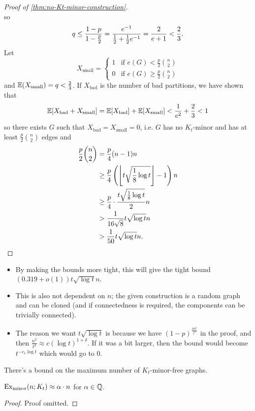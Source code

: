\documentclass[main.tex]{subfiles}
\begin{document}
\begin{proof}[Proof of \th\ref{thm:no-Kt-minor-construction}]
\[  \]
  so
  \begin{align*}
    q\leq\frac{1-p}{1 - \frac p 2} = \frac{e^{-1}}{\frac{1}{2} + \frac{1}{2} e^{-1}} = \frac{2}{e+1} < \frac 2 3.
  \end{align*}
  Let
  \[
    X_{\mathrm{small}} = \begin{cases}
      1 & \text{if }e(G) < \frac p 2\binom n 2 \\
      0 & \text{if }e(G)\geq\frac p 2\binom n 2
    \end{cases}
  \]
  and $\mathbb E(X_{\mathrm{small}}) = q < \frac 2 3$.
  If $X_{\mathrm{bad}}$ is the number of bad partitions, we have shown that
  \[
    \mathbb E[X_{\mathrm{bad}} + X_{\mathrm{small}}]
    = \mathbb E[X_{\mathrm{bad}}] + \mathbb E[X_{\mathrm{small}}] < \frac{1}{e^2} + \frac 2 3 < 1
  \]
  so there exists $G$ such that $X_{\mathrm{bad}} = X_{\mathrm{small}} = 0$,
  i.e. $G$ has no $K_t$-minor and has at least $\frac p 2\binom{n}{2}$ edges and
  \begin{align*}
    \frac p 2\binom n 2 &= \frac p 4(n-1)n \\
                        &\geq\frac p 4\left(\left\lfloor t\sqrt{\frac 1 8\log t} \right\rfloor-1\right)n \\
                        &\geq\frac p 4\cdot\frac{t\sqrt{\frac 1 8\log t}}{2}n \\
                        &> \frac{1}{16\sqrt 8}t\sqrt{\log t}n \\
                        &> \frac{1}{50}t\sqrt{\log t}n. \qedhere
  \end{align*}
\end{proof}
\begin{remark*}
  \listhack
  \begin{itemize}
    \item By making the bounds more tight, this will give the tight bound
      $(0.319 + o(1))t\sqrt{\log t}n$.

    \item This is also not dependent on $n$; the given construction is a random
      graph and can be cloned (and if connectedness is required, the components
      can be trivially connected).

    \item The reason we want $t\sqrt{\log t}$ is because we have
      $(1 - p)^{\frac{4n^2}{t^2}}$ in the proof, and then
      $\frac{n^2}{t^2}\approx c(\log t)^{1 + \delta}$.
      If it was a bit larger, then the bound would become $t^{-c_1\log t}$
      which would go to 0.
  \end{itemize}
\end{remark*}
There's a bound on the maximum number of $K_t$-minor-free graphs.
\begin{theorem}
  $\operatorname{Ex}_{\mathrm{minor}}(n;K_t)\approx\alpha\cdot n$ for $\alpha\in\mathbb Q$.
\end{theorem}
\begin{proof}
  Proof omitted.
\end{proof}
\end{document}
